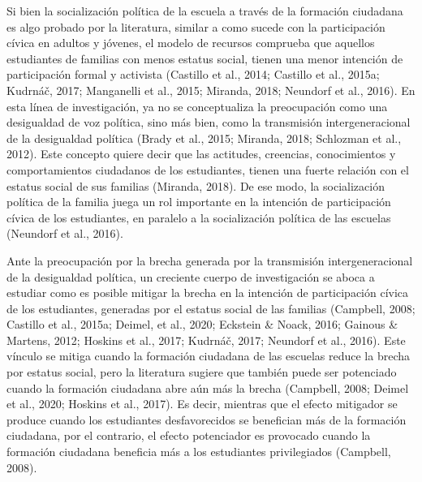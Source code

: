 \documentclass[12pt,twoside]{templates/facsothesis}
\begin{document}
Si bien la socialización política de la escuela a través de la formación ciudadana es algo probado por la literatura, similar a como sucede con la participación cívica en adultos y jóvenes, el modelo de recursos comprueba que aquellos estudiantes de familias con menos estatus social, tienen una menor intención de participación formal y activista (Castillo et al., 2014; Castillo et al., 2015a; Kudrnáč, 2017; Manganelli et al., 2015; Miranda, 2018; Neundorf et al., 2016). En esta línea de investigación, ya no se conceptualiza la preocupación como una desigualdad de voz política, sino más bien, como la transmisión intergeneracional de la desigualdad política (Brady et al., 2015; Miranda, 2018; Schlozman et al., 2012). Este concepto quiere decir que las actitudes, creencias, conocimientos y comportamientos ciudadanos de los estudiantes, tienen una fuerte relación con el estatus social de sus familias (Miranda, 2018). De ese modo, la socialización política de la familia juega un rol importante en la intención de participación cívica de los estudiantes, en paralelo a la socialización política de las escuelas (Neundorf et al., 2016).

Ante la preocupación por la brecha generada por la transmisión intergeneracional de la desigualdad política, un creciente cuerpo de investigación se aboca a estudiar como es posible mitigar la brecha en la intención de participación cívica de los estudiantes, generadas por el estatus social de las familias (Campbell, 2008; Castillo et al., 2015a; Deimel, et al., 2020; Eckstein \& Noack, 2016; Gainous \& Martens, 2012; Hoskins et al., 2017; Kudrnáč, 2017; Neundorf et al., 2016). Este vínculo se mitiga cuando la formación ciudadana de las escuelas reduce la brecha por estatus social, pero la literatura sugiere que también puede ser potenciado cuando la formación ciudadana abre aún más la brecha (Campbell, 2008; Deimel et al., 2020; Hoskins et al., 2017). Es decir, mientras que el efecto mitigador se produce cuando los estudiantes desfavorecidos se benefician más de la formación ciudadana, por el contrario, el efecto potenciador es provocado cuando la formación ciudadana beneficia más a los estudiantes privilegiados (Campbell, 2008).
\end{document}
